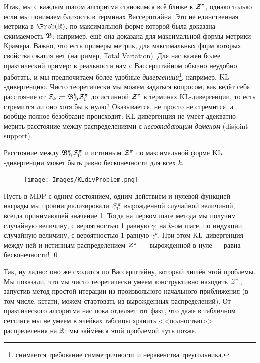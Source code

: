 Итак, мы с каждым шагом алгоритма становимся всё ближе к $\mathcal{Z}^\pi$, однако только если мы понимаем близость в терминах Вассерштайна. Это не единственная метрика в $\Prob ( \R )$, по максимальной форме которой была доказана сжимаемость $\mathfrak{B}$; например, ещё она доказана для максимальной формы метрики Крамера. Важно, что есть примеры метрик, для максимальных форм которых свойства сжатия нет (например, \href{https://en.wikipedia.org/wiki/Total_variation_distance_of_probability_measures}{Total Variation}). Для нас важен более практический пример: в реальности нам с Вассерштайном обычно неудобно работать, и мы предпочитаем более удобные \emph{дивергенции}\footnote{снимается требование симметричности и неравенства треугольника.}, например, $\operatorname{KL}$-дивергенцию. Чисто теоретически мы можем задаться вопросом, как ведёт себя расстояние от $\Z_k \HM\coloneqq \B_D^k \Z^\pi_0$ до истинной $\mathcal{Z}^{\pi}$ в терминах KL-дивергенции, то есть стремится ли оно хотя бы к нулю? Оказывается, не просто не стремится, а вообще полное безобразие происходит: KL-дивергенция не умеет адекватно мерить расстояние между распределениями с \emph{несовпадающим доменом} (disjoint support).

\begin{theorem}
Расстояние между $\mathfrak{B}_D^k \mathcal{Z}^\pi_0$ и истинным $\mathcal{Z}^\pi$ по максимальной форме $\operatorname{KL}$-дивергенции может быть равно бесконечности для всех $k$.

\begin{figure}
\vspace{-1cm}
\centering
\texttt{[image: Images/KLdivProblem.png]}
\vspace{-0.5cm}
\end{figure}
\beginproof[Пример]
Пусть в MDP с одним состоянием, одним действием и нулевой функцией награды мы проинициализировали $\mathcal{Z}^\pi_0$ вырожденной случайной величиной, всегда принимающей значение 1. Тогда на первом шаге метода мы получим случайную величину, с вероятностью 1 равную $\gamma$; на $k$-ом шаге, по индукции, случайную величину, с вероятностью 1 равную $\gamma^k$. При этом $\operatorname{KL}$-дивергенция между ней и истинным распределением $\mathcal{Z}^\pi$ --- вырожденной в нуле --- равна бесконечности! \qed
\end{theorem}

Так, ну ладно: оно же сходится по Вассерштайну, который лишён этой проблемы. Мы показали, что мы чисто теоретически умеем конструктивно находить $\mathcal{Z}^{\pi}$, запустив метод простой итерации из произвольного начального приближения (в том числе, кстати, можем стартовать из вырожденных распределений). От практического алгоритма нас пока отделяет тот факт, что даже в табличном сеттинге мы не умеем в ячейках таблицы хранить <<полностью>> распределения на $\mathbb{R}$; мы займёмся этой проблемой чуть позже.

